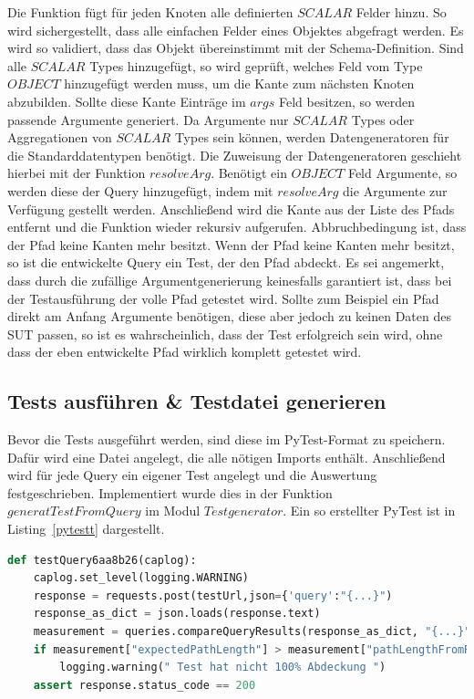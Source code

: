 Die Funktion fügt für jeden Knoten alle definierten $SCALAR$ Felder hinzu.
So wird sichergestellt, dass alle einfachen Felder eines Objektes abgefragt werden.
Es wird so validiert, dass das Objekt übereinstimmt mit der Schema-Definition.
Sind alle $SCALAR$ Types hinzugefügt, so wird geprüft, welches Feld vom Type $OBJECT$ hinzugefügt werden muss, um die Kante zum nächsten Knoten abzubilden.
Sollte diese Kante Einträge im $args$ Feld besitzen, so werden passende Argumente generiert.
Da Argumente nur $SCALAR$ Types oder Aggregationen von $SCALAR$ Types sein können, werden Datengeneratoren für die Standarddatentypen benötigt.
Die Zuweisung der Datengeneratoren geschieht hierbei mit der Funktion $resolveArg$.
Benötigt ein $OBJECT$ Feld Argumente, so werden diese der Query hinzugefügt, indem mit $resolveArg$ die Argumente zur Verfügung gestellt werden.
Anschließend wird die Kante aus der Liste des Pfads entfernt und die Funktion wieder rekursiv aufgerufen.
Abbruchbedingung ist, dass der Pfad keine Kanten mehr besitzt.
Wenn der Pfad keine Kanten mehr besitzt, so ist die entwickelte Query ein Test, der den Pfad abdeckt.
Es sei angemerkt, dass durch die zufällige Argumentgenerierung keinesfalls garantiert ist, dass bei der Testausführung der volle Pfad getestet wird.
Sollte zum Beispiel ein Pfad direkt am Anfang Argumente benötigen, diese aber jedoch zu keinen Daten des SUT passen, so ist es wahrscheinlich,
dass der Test erfolgreich sein wird, ohne dass der eben entwickelte Pfad wirklich komplett getestet wird.
\newpage

\subsection{Tests ausführen \& Testdatei generieren}

Bevor die Tests ausgeführt werden, sind diese im PyTest-Format zu speichern.
Dafür wird eine Datei angelegt, die alle nötigen Imports enthält.
Anschließend wird für jede Query ein eigener Test angelegt und die Auswertung festgeschrieben.
Implementiert wurde dies in der Funktion $generatTestFromQuery$ im Modul $Testgenerator$.
Ein so erstellter PyTest ist in Listing~\ref{pytestt} dargestellt.

\begin{lstlisting}[language=Python, caption={PyTest einer Query}, label={pytestt}]
def testQuery6aa8b26(caplog):
    caplog.set_level(logging.WARNING)
    response = requests.post(testUrl,json={'query':"{...}")
    response_as_dict = json.loads(response.text)
    measurement = queries.compareQueryResults(response_as_dict, "{...}")
    if measurement["expectedPathLength"] > measurement["pathLengthFromResult"]:
        logging.warning(" Test hat nicht 100% Abdeckung ")
    assert response.status_code == 200
\end{lstlisting}

